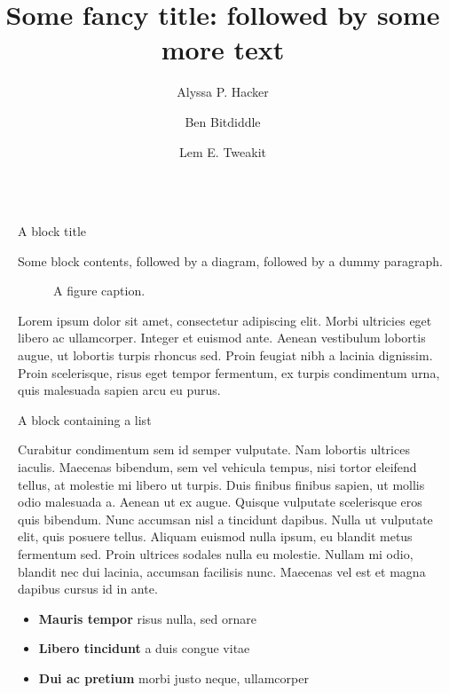 \documentclass[final]{beamer}
\title{Some fancy title: followed by some more text}
\author{Alyssa P. Hacker \inst{1} \and Ben Bitdiddle \inst{2} \and Lem E. Tweakit \inst{2}}
\institute[shortinst]{\inst{1} Some Institute \samelineand \inst{2} Another Institute}
\newlength{\sepwidth}
\newlength{\colwidth}
\newcommand{\separatorcolumn}{\begin{column}{\sepwidth}\end{column}}
\begin{document}
\begin{frame}[t]
\begin{columns}[t]
\separatorcolumn

\begin{column}{\colwidth}

  \begin{block}{A block title}

    Some block contents, followed by a diagram, followed by a dummy paragraph.

    \begin{figure}
      \centering
      \caption{A figure caption.}
    \end{figure}

    Lorem ipsum dolor sit amet, consectetur adipiscing elit. Morbi ultricies
    eget libero ac ullamcorper. Integer et euismod ante. Aenean vestibulum
    lobortis augue, ut lobortis turpis rhoncus sed. Proin feugiat nibh a
    lacinia dignissim. Proin scelerisque, risus eget tempor fermentum, ex
    turpis condimentum urna, quis malesuada sapien arcu eu purus.

  \end{block}

  \begin{block}{A block containing a list}

    Curabitur condimentum sem id semper vulputate. Nam lobortis ultrices
    iaculis. Maecenas bibendum, sem vel vehicula tempus, nisi tortor eleifend
    tellus, at molestie mi libero ut turpis. Duis finibus finibus sapien, ut
    mollis odio malesuada a. Aenean ut ex augue. Quisque vulputate scelerisque
    eros quis bibendum. Nunc accumsan nisl a tincidunt dapibus. Nulla ut
    vulputate elit, quis posuere tellus. Aliquam euismod nulla ipsum, eu
    blandit metus fermentum sed. Proin ultrices sodales nulla eu molestie.
    Nullam mi odio, blandit nec dui lacinia, accumsan facilisis nunc. Maecenas
    vel est et magna dapibus cursus id in ante.

    \begin{itemize}
      \item \textbf{Mauris tempor} risus nulla, sed ornare
      \item \textbf{Libero tincidunt} a duis congue vitae
      \item \textbf{Dui ac pretium} morbi justo neque, ullamcorper
    \end{itemize}


\end{block}
\end{column}
\end{columns}
\end{frame}
\end{document}
